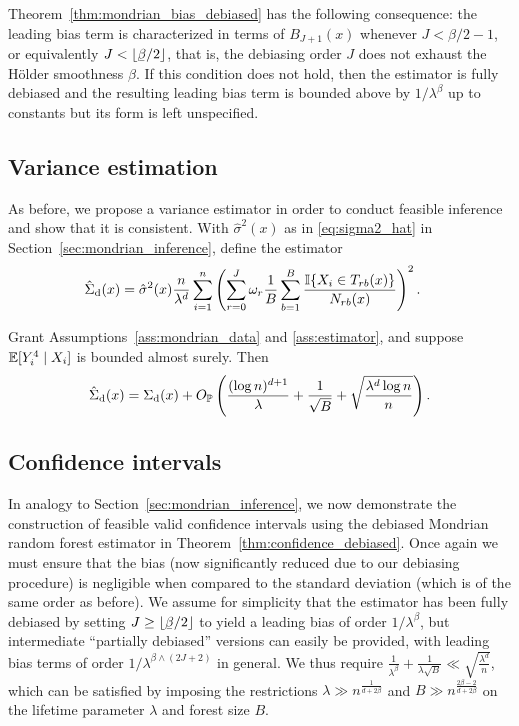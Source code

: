 Theorem~\ref{thm:mondrian_bias_debiased} has the following consequence:
the leading bias term is characterized in terms of
$B_{J+1}(x)$ whenever $J < \beta/2 - 1$,
or equivalently $J < \lfloor \flbeta/2 \rfloor$,
that is, the debiasing order
$J$ does not exhaust the H{\"o}lder smoothness $\beta$.
If this condition does not hold, then the estimator is
fully debiased and the resulting leading bias
term is bounded above by $1/\lambda^\beta$ up to constants
but its form is left unspecified.

\subsection*{Variance estimation}

As before, we propose a variance estimator in order to conduct feasible
inference and show that it is consistent.
With $\hat\sigma^2(x)$ as in \eqref{eq:sigma2_hat}
in Section~\ref{sec:mondrian_inference}, define the estimator
%
\begin{align*}
  \hat\Sigma_{\mathrm{d}}(x)
  &=
  \hat\sigma^2(x)
  \frac{n}{\lambda^d}
  \sum_{i=1}^n
  \left(
    \sum_{r=0}^J
    \omega_r
    \frac{1}{B}
    \sum_{b=1}^B
    \frac{\mathbb{I}\{X_i \in T_{r b}(x)\}}
    {N_{r b}(x)}
  \right)^2.
\end{align*}
%
\begin{theorem}%
  \label{thm:variance_estimation_debiased}
  Grant Assumptions~\ref{ass:mondrian_data} and \ref{ass:estimator}, and
  suppose $\mathbb{E}[Y_i^4 \mid X_i ]$ is bounded almost surely. Then
  \begin{align*}
    \hat\Sigma_{\mathrm{d}}(x)
    = \Sigma_{\mathrm{d}}(x)
    + O_{\mathbb{P}} \left(
      \frac{(\log n)^{d+1}}{\lambda}
      + \frac{1}{\sqrt B}
      + \sqrt{\frac{\lambda^d \log n}{n}}
    \right).
  \end{align*}
\end{theorem}

\subsection{Confidence intervals}

In analogy to Section~\ref{sec:mondrian_inference},
we now demonstrate the construction of feasible valid confidence
intervals using the debiased Mondrian random forest estimator
in Theorem~\ref{thm:confidence_debiased}.
Once again we must ensure that the bias
(now significantly reduced due to our debiasing procedure)
is negligible when compared to the standard deviation
(which is of the same order as before).
We assume for simplicity that the estimator has been fully
debiased by setting $J \geq \lfloor \flbeta / 2\rfloor$
to yield a leading bias of order $1/\lambda^\beta$,
but intermediate ``partially debiased'' versions can easily
be provided, with leading bias terms of order
$1/\lambda^{\beta \wedge (2J+2)}$ in general.
We thus require
$\frac{1}{\lambda^\beta} + \frac{1}{\lambda \sqrt B}
\ll \sqrt{\frac{\lambda^d}{n}}$,
which can be satisfied by imposing the restrictions
$\lambda \gg n^{\frac{1}{d + 2 \beta}}$
and $B \gg n^{\frac{2\beta - 2}{d + 2\beta}}$
on the lifetime parameter $\lambda$
and forest size $B$.

